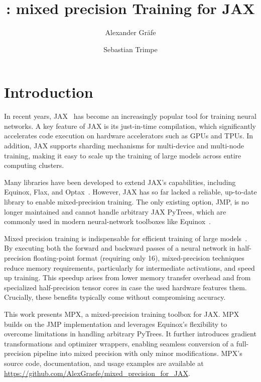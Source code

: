 \documentclass[10pt, a4paper, logo, onecolumn, internal, copyright]{dsme}
\title{\mpx{}: mixed precision Training for JAX}
\author[1]{Alexander Gräfe}
\author[1]{Sebastian Trimpe}
\affil[1]{RWTH Aachen University}
\date{}
\newcommand{\mpx}{\textsc{MPX}}
\begin{document}
\maketitle

\section{Introduction}

In recent years, JAX~\cite{deepmind2020jax} has become an increasingly popular tool for training neural networks. 
A key feature of JAX is its just-in-time compilation, which significantly accelerates code execution on hardware accelerators such as GPUs and TPUs. 
In addition, JAX supports sharding mechanisms for multi-device and multi-node training, making it easy to scale up the training of large models across entire computing clusters. 

Many libraries have been developed to extend JAX's capabilities, including Equinox, Flax, and Optax~\citep{kidger2021equinox,flax2020github,deepmind2020jax}. 
However, JAX has so far lacked a reliable, up-to-date library to enable mixed-precision training. The only existing option, JMP\citep{jmp}, is no longer maintained and cannot handle arbitrary JAX PyTrees, which are commonly used in modern neural-network toolboxes like Equinox~\citep{kidger2021equinox}.

Mixed precision training is indispensable for efficient training of large models~\cite{mixed_precision_paper}. 
By executing both the forward and backward passes of a neural network in half-precision floating-point format (requiring only \qty{16}{\bit}), mixed-precision techniques reduce memory requirements, particularly for intermediate activations, and speed up training. 
This speedup arises from lower memory transfer overhead and from specialized half-precision tensor cores in case the used hardware features them. 
Crucially, these benefits typically come without compromising accuracy.

This work presents \mpx{}, a mixed-precision training toolbox for JAX. 
\mpx{} builds on the JMP implementation and leverages Equinox's flexibility to overcome limitations in handling arbitrary PyTrees. It further introduces gradient transformations and optimizer wrappers, enabling seamless conversion of a full-precision pipeline into mixed precision with only minor modifications. \mpx{}'s source code, documentation, and usage examples are available at \url{https://github.com/AlexGraefe/mixed_precision_for_JAX}.
\end{document}
